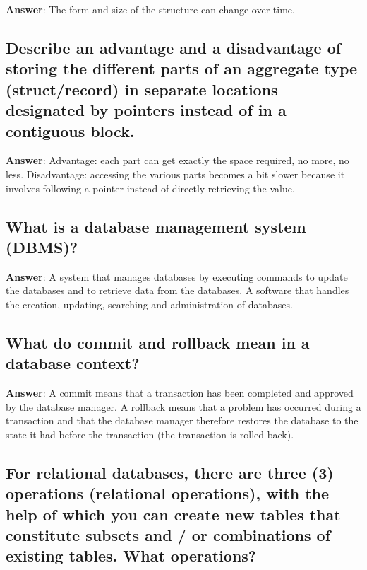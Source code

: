 \documentclass[a4paper,11pt,oneside]{article}
\begin{document}
\begin{sloppypar}
\label{q:275:sa:en:True}

\textbf{Answer}: The form and size of the structure can change over time.



\subsection{Describe an advantage and a disadvantage of storing the different parts of an aggregate type (struct/record) in separate locations designated by pointers instead of in a contiguous block.}

\label{q:276:sa:en:True}

\textbf{Answer}: Advantage: each part can get exactly the space required, no more, no less. Disadvantage: accessing the various parts becomes a bit slower because it involves following a pointer instead of directly retrieving the value.



\subsection{What is a database management system (DBMS)?}

\label{q:277:sa:en:True}

\textbf{Answer}: A system that manages databases by executing commands to update the databases and to retrieve data from the databases. A software that handles the creation, updating, searching and administration of databases.



\subsection{What do commit and rollback mean in a database context?}

\label{q:278:sa:en:True}

\textbf{Answer}: A commit means that a transaction has been completed and approved by the database manager. A rollback means that a problem has occurred during a transaction and that the database manager therefore restores the database to the state it had before the transaction (the transaction is rolled back).



\subsection{For relational databases, there are three (3) operations (relational operations), with the help of which you can create new tables that constitute subsets and / or combinations of existing tables. What operations?}


\end{sloppypar}
\end{document}

